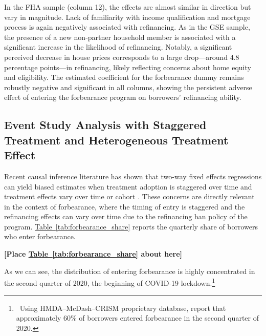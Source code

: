 \documentclass[11pt]{article}
\begin{document}
{In the FHA sample (column 12), the effects are almost similar in direction but vary in magnitude. Lack of familiarity with income qualification and mortgage process is again negatively associated with refinancing. As in the GSE sample, the presence of a new non-partner household member is associated with a significant increase in the likelihood of refinancing. Notably, a significant perceived decrease in house prices corresponds to a large drop—around 4.8 percentage points—in refinancing, likely reflecting concerns about home equity and eligibility. The estimated coefficient for the forbearance dummy remains robustly negative and significant in all columns, showing the persistent adverse effect of entering the forbearance program on borrowers' refinancing ability. 


\subsection{Event Study Analysis with Staggered Treatment and Heterogeneous Treatment Effect}
\label{sec:event_study}

Recent causal inference literature has shown that two-way fixed effects regressions can yield biased estimates when treatment adoption is staggered over time and treatment effects vary over time or cohort \citep{de2020two, goodman2021difference, callaway2021difference, sunAbraham2021, baker2022much, borusyak2024revisiting}. These concerns are directly relevant in the context of forbearance, where the timing of entry is staggered and the refinancing effects can vary over time due to the refinancing ban policy of the program.  \hyperref[tab:forbearance_share]{Table~\ref*{tab:forbearance_share}} reports the quarterly share of borrowers who enter forbearance.

\bigskip
\centerline{\bf [Place \hyperref[tab:forbearance_share]{Table~\ref*{tab:forbearance_share}} about here]}
\bigskip

As we can see, the distribution of entering forbearance is highly concentrated in the second quarter of 2020, the beginning of COVID-19 lockdown.\footnote{~Using HMDA–McDash–CRISM proprietary database, \citet{an2022inequality} report that approximately 60\% of borrowers entered forbearance in the second quarter of 2020.} 

}
\end{document}
